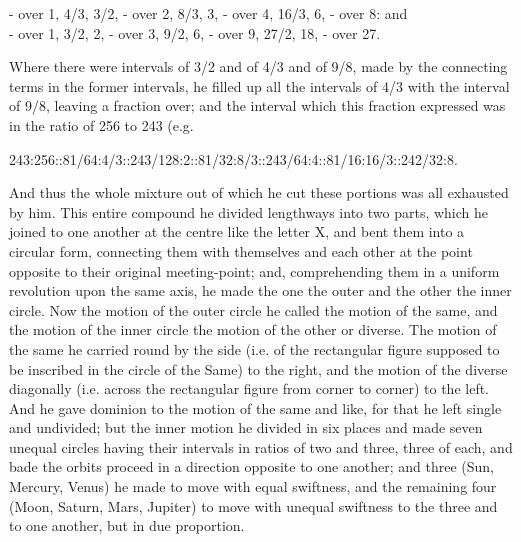 - over 1, 4/3, 3/2, - over 2, 8/3, 3, - over 4, 16/3, 6, - over 8: and\\
- over 1, 3/2, 2, - over 3, 9/2, 6, - over 9, 27/2, 18, - over 27.

Where there were intervals of 3/2 and of 4/3 and of 9/8, made by the
connecting terms in the former intervals, he filled up all the intervals
of 4/3 with the interval of 9/8, leaving a fraction over; and the interval
which this fraction expressed was in the ratio of 256 to 243 (e.g.

243:256::81/64:4/3::243/128:2::81/32:8/3::243/64:4::81/16:16/3::242/32:8.

And thus the whole mixture out of which he cut these portions was all
exhausted by him. This entire compound he divided lengthways into two
parts, which he joined to one another at the centre like the letter X, and
bent them into a circular form, connecting them with themselves and each
other at the point opposite to their original meeting-point; and,
comprehending them in a uniform revolution upon the same axis, he made the
one the outer and the other the inner circle. Now the motion of the outer
circle he called the motion of the same, and the motion of the inner
circle the motion of the other or diverse. The motion of the same he
carried round by the side (i.e. of the rectangular figure supposed to be
inscribed in the circle of the Same) to the right, and the motion of the
diverse diagonally (i.e. across the rectangular figure from corner to
corner) to the left. And he gave dominion to the motion of the same and
like, for that he left single and undivided; but the inner motion he
divided in six places and made seven unequal circles having their
intervals in ratios of two and three, three of each, and bade the orbits
proceed in a direction opposite to one another; and three (Sun, Mercury,
Venus) he made to move with equal swiftness, and the remaining four (Moon,
Saturn, Mars, Jupiter) to move with unequal swiftness to the three and to
one another, but in due proportion.

